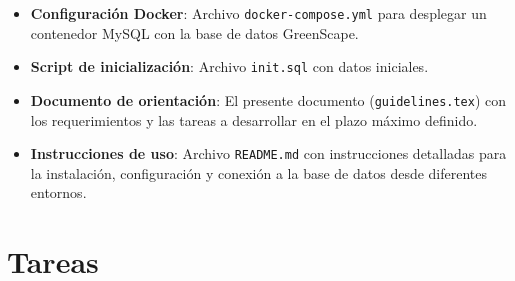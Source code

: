 \documentclass[10pt]{article}
\begin{document}
	\begin{itemize}
		\item \textbf{Configuración Docker}: Archivo \texttt{docker-compose.yml} para desplegar un contenedor MySQL con la base de datos GreenScape. 
		
		\item \textbf{Script de inicialización}: Archivo \texttt{init.sql} con datos iniciales.
		
		\item \textbf{Documento de orientación}: El presente documento (\texttt{guidelines.tex}) con los requerimientos y las tareas a desarrollar en el plazo máximo definido.
		
		\item \textbf{Instrucciones de uso}: Archivo \texttt{README.md} con instrucciones detalladas para la instalación, configuración y conexión a la base de datos desde diferentes entornos.
	\end{itemize}
	
	\section*{Tareas}
	
\end{document}
